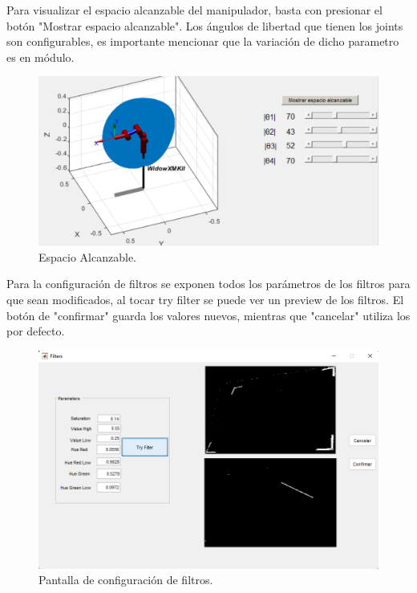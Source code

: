 Para visualizar el espacio alcanzable del manipulador, basta con presionar el botón "Mostrar espacio alcanzable". Los ángulos de libertad que tienen los joints son configurables, es importante mencionar que la variación de dicho parametro es en módulo.
\begin{figure}[H]
	\centering
	\includegraphics[width=0.7\linewidth]{alcanzable}
	\caption{Espacio Alcanzable.}	
	\label{fig:alcanzable}
\end{figure}
Para la configuraci\'on de filtros se exponen todos los par\'ametros de los filtros para que sean modificados, al tocar try filter se puede ver un preview de los filtros.
El bot\'on de "confirmar" guarda los valores nuevos, mientras que "cancelar" utiliza los por defecto.

\begin{figure}[H]
	\centering
	\includegraphics[width=\linewidth]{filtros}
	\caption{Pantalla de configuraci\'on de filtros.}	
	\label{fig:filtros}
\end{figure}


